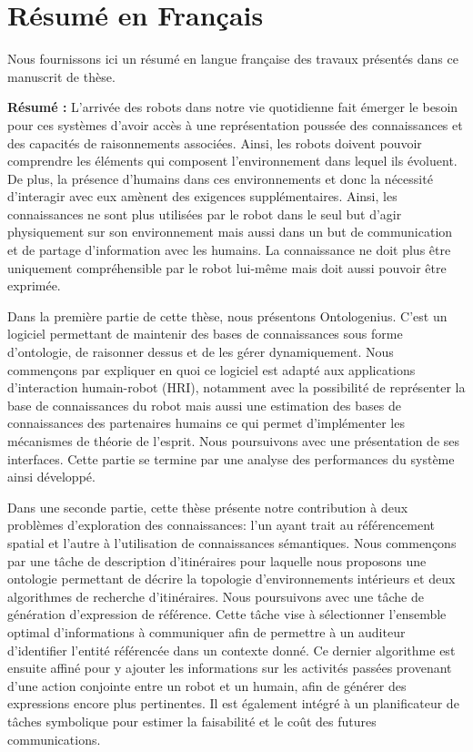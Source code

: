 \chapter{Résumé en Français}
\label{app:fr_long}

Nous fournissons ici un résumé en langue française des travaux présentés dans ce manuscrit de thèse.

\textbf{Résumé :}
L’arrivée des robots dans notre vie quotidienne fait émerger le besoin pour ces systèmes d’avoir accès à une représentation poussée des connaissances et des capacités de raisonnements associées. Ainsi, les robots doivent pouvoir comprendre les éléments qui composent l’environnement dans lequel ils évoluent. De plus, la présence d’humains dans ces environnements et donc la nécessité d’interagir avec eux amènent des exigences supplémentaires. Ainsi, les connaissances ne sont plus utilisées par le robot dans le seul but d’agir physiquement sur son environnement mais aussi dans un but de communication et de partage d’information avec les humains. La connaissance ne doit plus être uniquement compréhensible par le robot lui-même mais doit aussi pouvoir être exprimée.

Dans la première partie de cette thèse, nous présentons Ontologenius. C’est un logiciel permettant de maintenir des bases de connaissances sous forme d’ontologie, de raisonner dessus et de les gérer dynamiquement. Nous commençons par expliquer en quoi ce logiciel est adapté aux applications d’interaction humain-robot (HRI), notamment avec la possibilité de représenter la base de connaissances du robot mais aussi une estimation des bases de connaissances des partenaires humains ce qui permet d’implémenter les mécanismes de théorie de l’esprit. Nous poursuivons avec une présentation de ses interfaces. Cette partie se termine par une analyse des performances du système ainsi développé.

Dans une seconde partie, cette thèse présente notre contribution à deux problèmes d’exploration des connaissances: l’un ayant trait au référencement spatial et l’autre à l’utilisation de connaissances sémantiques. Nous commençons par une tâche de description d’itinéraires pour laquelle nous proposons une ontologie permettant de décrire la topologie d’environnements intérieurs et deux algorithmes de recherche d’itinéraires. Nous poursuivons avec une tâche de génération d’expression de référence. Cette tâche vise à sélectionner l’ensemble optimal d’informations à communiquer afin de permettre à un auditeur d’identifier l’entité référencée dans un contexte donné. Ce dernier algorithme est ensuite affiné pour y ajouter les informations sur les activités passées provenant d’une action conjointe entre un robot et un humain, afin de générer des expressions encore plus pertinentes. Il est également intégré à un planificateur de tâches symbolique pour estimer la faisabilité et le coût des futures communications.


